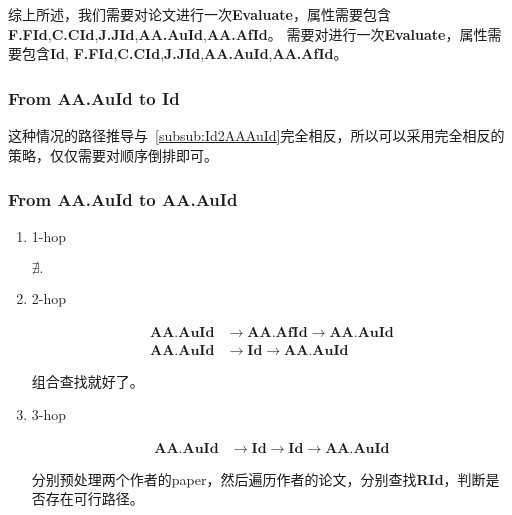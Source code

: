 \documentclass[hyperref,UTF8]{ctexart}
\theoremstyle{definition}
\theoremstyle{remark}
\numberwithin{equation}{subsection}
\newcommand{\Emph}{\textbf}
\newcommand{\Evaluate}{\Emph{Evaluate}}
\newcommand{\Id}{\Emph{Id}}
\newcommand{\RId}{\Emph{RId}}
\newcommand{\FFId}{\Emph{F.FId}}
\newcommand{\CCId}{\Emph{C.CId}}
\newcommand{\JJId}{\Emph{J.JId}}
\newcommand{\AAAuId}{\Emph{AA.AuId}}
\newcommand{\AAAfId}{\Emph{AA.AfId}}
\begin{document}
	综上所述，我们需要对论文进行一次\Evaluate，属性需要包含\FFId,\CCId,\JJId,\AAAuId,\AAAfId。
	需要对进行一次\Evaluate，属性需要包含\Id, \FFId,\CCId,\JJId,\AAAuId,\AAAfId。
	
\subsubsection{From \Emph{AA.AuId} to \Emph{Id}}
\label{subsub:AAAuId2Id}

	这种情况的路径推导与~\ref{subsub:Id2AAAuId}完全相反，所以可以采用完全相反的策略，仅仅需要对顺序倒排即可。
	
\subsubsection{From \Emph{AA.AuId} to \Emph{AA.AuId}}

	\begin{enumerate}[(1)]
	
		\item 1-hop
		
		$\nexists.$
		
		\item 2-hop
		
		\begin{align}
			\AAAuId &\rightarrow \AAAfId \rightarrow \AAAuId	\\
			\AAAuId &\rightarrow \Id	\rightarrow \AAAuId
		\end{align}
		
		组合查找就好了。
		
		\item 3-hop
		
		\begin{align}
			\AAAuId &\rightarrow \Id \rightarrow \Id \rightarrow \AAAuId
		\end{align}
		
		分别预处理两个作者的paper，然后遍历作者的论文，分别查找\RId，判断是否存在可行路径。
		
	\end{enumerate}
	
\end{document}
